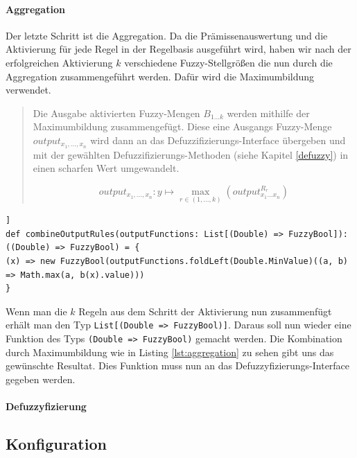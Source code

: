 \documentclass[12pt,a4paper,bibliography=totocnumbered,listof=totocnumbered, abstracton]{scrartcl}
\def\code#1{\texttt{#1}}
\theoremstyle{Umgebung}
\begin{document}
\paragraph{Aggregation}

Der letzte Schritt ist die Aggregation. Da die Prämissenauswertung und die Aktivierung für jede Regel in der Regelbasis ausgeführt wird, haben wir nach der erfolgreichen Aktivierung $k$ verschiedene Fuzzy-Stellgrößen die nun durch die Aggregation zusammengeführt werden. Dafür wird die Maximumbildung verwendet.

\begin{quote}
Die Ausgabe aktivierten Fuzzy-Mengen $B_{1...k}$ werden mithilfe der Maximumbildung zusammengefügt. Diese eine Ausgangs Fuzzy-Menge $	output_{x_1,..., x_n}$ wird dann an das Defuzzifizierungs-Interface übergeben und mit der gewählten Defuzzifizierungs-Methoden (siehe Kapitel \ref{defuzzy}) in einen scharfen Wert umgewandelt.

\begin{equation}
output_{x_1,..., x_n}: y \mapsto \max_{r \in (1,...,k)}(output^{R_r}_{x_1...x_n})
\end{equation}
\end{quote}

\begin{lstlisting}[firstnumber=1, style=myScalastyle, caption=Berechnung der Aggregation, label=lst:aggregation]]
def combineOutputRules(outputFunctions: List[(Double) => FuzzyBool]): ((Double) => FuzzyBool) = {
(x) => new FuzzyBool(outputFunctions.foldLeft(Double.MinValue)((a, b) => Math.max(a, b(x).value)))
}
\end{lstlisting}

Wenn man die $k$ Regeln aus dem Schritt der Aktivierung nun zusammenfügt erhält man den Typ \code{List[(Double => FuzzyBool)]}. Daraus soll nun wieder eine Funktion des Typs \code{(Double => FuzzyBool)} gemacht werden. Die Kombination durch Maximumbildung wie in Listing \ref{lst:aggregation} zu sehen gibt uns das gewünschte Resultat. Dies Funktion muss nun an das Defuzzyfizierungs-Interface gegeben werden.

\paragraph{Defuzzyfizierung}




\subsection{Konfiguration}
\end{document}
